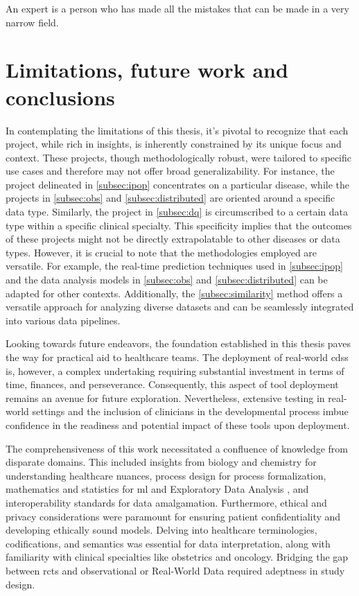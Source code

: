 \begin{savequote}[75mm]
An expert is a person who has made all the mistakes that can be made in a very narrow field.
\end{savequote}
\chapter{Limitations, future work and conclusions} \label{chap:conclusion}

In contemplating the limitations of this thesis, it's pivotal to recognize that each project, while rich in insights, is inherently constrained by its unique focus and context. These projects, though methodologically robust, were tailored to specific use cases and therefore may not offer broad generalizability. For instance, the project delineated in \ref{subsec:ipop} concentrates on a particular disease, while the projects in \ref{subsec:obs} and \ref{subsec:distributed} are oriented around a specific data type. Similarly, the project in \ref{subsec:dq} is circumscribed to a certain data type within a specific clinical specialty. This specificity implies that the outcomes of these projects might not be directly extrapolatable to other diseases or data types. However, it is crucial to note that the methodologies employed are versatile. For example, the real-time prediction techniques used in \ref{subsec:ipop} and the data analysis models in \ref{subsec:obs} and \ref{subsec:distributed} can be adapted for other contexts. Additionally, the \ref{subsec:similarity} method offers a versatile approach for analyzing diverse datasets and can be seamlessly integrated into various data pipelines.

Looking towards future endeavors, the foundation established in this thesis paves the way for practical aid to healthcare teams. The deployment of real-world \ac{cdss} is, however, a complex undertaking requiring substantial investment in terms of time, finances, and perseverance. Consequently, this aspect of tool deployment remains an avenue for future exploration. Nevertheless, extensive testing in real-world settings and the inclusion of clinicians in the developmental process imbue confidence in the readiness and potential impact of these tools upon deployment.


The comprehensiveness of this work necessitated a confluence of knowledge from disparate domains. This included insights from biology and chemistry for understanding healthcare nuances, process design for process formalization, mathematics and statistics for \ac{ml} and Exploratory Data Analysis , and interoperability standards for data amalgamation. Furthermore, ethical and privacy considerations were paramount for ensuring patient confidentiality and developing ethically sound models. Delving into healthcare terminologies, codifications, and semantics was essential for data interpretation, along with familiarity with clinical specialties like obstetrics and oncology. Bridging the gap between \acp{rct} and observational or Real-World Data required adeptness in study design.

